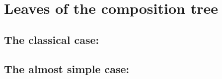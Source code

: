 
\chapter{Leaves of the composition tree}
\label{chap:leaves}

\section{The classical case: }
\label{solveC8}

\section{The almost simple case: }
\label{solveC9}

